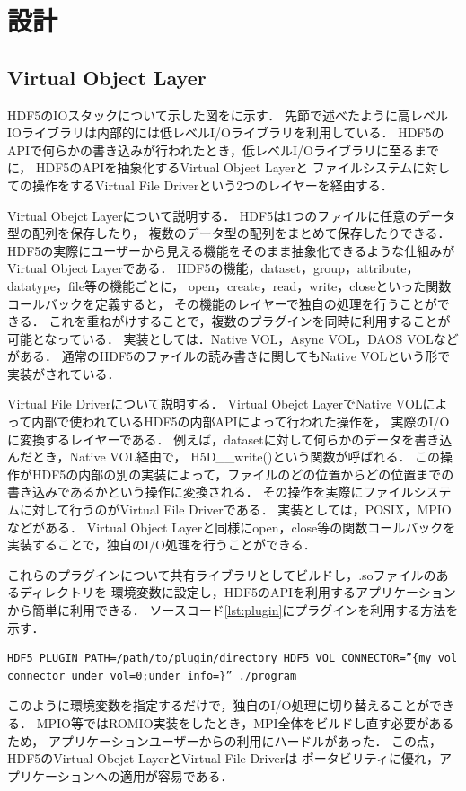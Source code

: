 \documentclass[submit,techrep,noauthor]{ipsj}
\begin{document}
\section{設計}
\subsection{Virtual Object Layer}
HDF5のIOスタックについて示した図をに示す．
先節で述べたように高レベルIOライブラリは内部的には低レベルI/Oライブラリを利用している．
HDF5のAPIで何らかの書き込みが行われたとき，低レベルI/Oライブラリに至るまでに，
HDF5のAPIを抽象化するVirtual Object Layerと
ファイルシステムに対しての操作をするVirtual File Driverという2つのレイヤーを経由する．

Virtual Obejct Layerについて説明する．
HDF5は1つのファイルに任意のデータ型の配列を保存したり，
複数のデータ型の配列をまとめて保存したりできる．
HDF5の実際にユーザーから見える機能をそのまま抽象化できるような仕組みがVirtual Object Layerである．
HDF5の機能，dataset，group，attribute，datatype，file等の機能ごとに，
open，create，read，write，closeといった関数コールバックを定義すると，
その機能のレイヤーで独自の処理を行うことができる．
これを重ねがけすることで，複数のプラグインを同時に利用することが可能となっている．
実装としては．Native VOL，Async VOL，DAOS VOLなどがある．
通常のHDF5のファイルの読み書きに関してもNative VOLという形で実装がされている．

Virtual File Driverについて説明する．
Virtual Obejct LayerでNative VOLによって内部で使われているHDF5の内部APIによって行われた操作を，
実際のI/Oに変換するレイヤーである．
例えば，datasetに対して何らかのデータを書き込んだとき，Native VOL経由で，
H5D\_\_write()という関数が呼ばれる．
この操作がHDF5の内部の別の実装によって，ファイルのどの位置からどの位置までの書き込みであるかという操作に変換される．
その操作を実際にファイルシステムに対して行うのがVirtual File Driverである．
実装としては，POSIX，MPIOなどがある．
Virtual Object Layerと同様にopen，close等の関数コールバックを実装することで，独自のI/O処理を行うことができる．

これらのプラグインについて共有ライブラリとしてビルドし，.soファイルのあるディレクトリを
環境変数に設定し，HDF5のAPIを利用するアプリケーションから簡単に利用できる．
ソースコード\ref{lst:plugin}にプラグインを利用する方法を示す．
\begin{lstlisting}[caption=プラグインの利用方法, label=lst:plugin]
HDF5 PLUGIN PATH=/path/to/plugin/directory HDF5 VOL CONNECTOR=”{my vol connector under vol=0;under info=}” ./program
\end{lstlisting}
このように環境変数を指定するだけで，独自のI/O処理に切り替えることができる．
MPIO等ではROMIO実装をしたとき，MPI全体をビルドし直す必要があるため，
アプリケーションユーザーからの利用にハードルがあった．
この点，HDF5のVirtual Obejct LayerとVirtual File Driverは
ポータビリティに優れ，アプリケーションへの適用が容易である．
\end{document}
